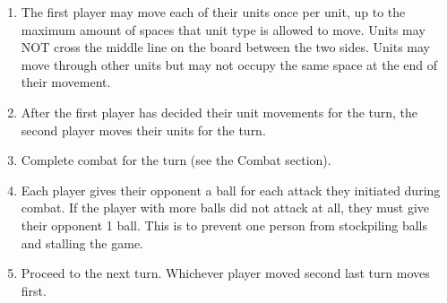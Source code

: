 \documentclass[10pt]{article}
\begin{document}
\begin{enumerate}
\item The first player may move each of their units once per unit, up to the maximum amount of spaces that unit type is allowed to move. Units may NOT cross the middle line on the board between the two sides. Units may move through other units but may not occupy the same space at the end of their movement.
\item After the first player has decided their unit movements for the turn, the second player moves their units for the turn.
\item Complete combat for the turn (see the Combat section).
\item Each player gives their opponent a ball for each attack they initiated during combat. If the player with more balls did not attack at all, they must give their opponent 1 ball. This is to prevent one person from stockpiling balls and stalling the game.
\item Proceed to the next turn. Whichever player moved second last turn moves first.
	
\end{enumerate}
\end{document}
